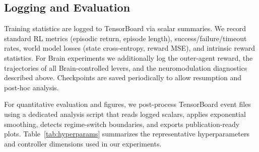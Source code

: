 ﻿\documentclass[sigconf]{acmart}
\begin{document}
\subsection{Logging and Evaluation}
Training statistics are logged to TensorBoard via scalar summaries. We record standard RL metrics (episodic return, episode length), success/failure/timeout rates, world model losses (state cross-entropy, reward MSE), and intrinsic reward statistics. For Brain experiments we additionally log the outer-agent reward, the trajectories of all Brain-controlled levers, and the neuromodulation diagnostics described above. Checkpoints are saved periodically to allow resumption and post-hoc analysis.

For quantitative evaluation and figures, we post-process TensorBoard event files using a dedicated analysis script that reads logged scalars, applies exponential smoothing, detects regime-switch boundaries, and exports publication-ready plots. Table~\ref{tab:hyperparams} summarizes the representative hyperparameters and controller dimensions used in our experiments.
\end{document}
